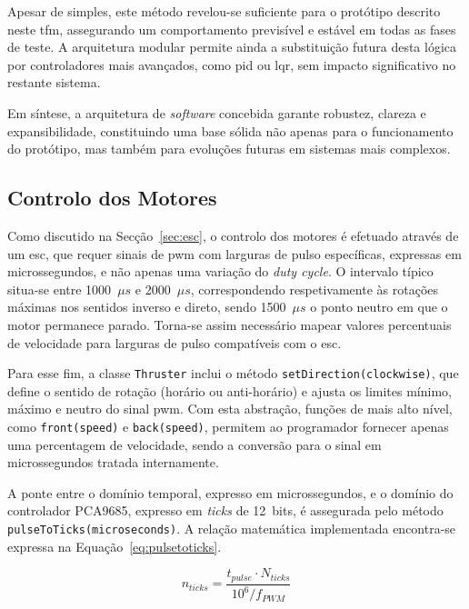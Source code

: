 Apesar de simples, este método revelou-se suficiente para o protótipo descrito neste \gls{tfm}, assegurando um comportamento previsível e estável em todas as fases de teste. A arquitetura modular permite ainda a substituição futura desta lógica por controladores mais avançados, como \acrfull{pid} ou \acrfull{lqr}, sem impacto significativo no restante sistema.  

Em síntese, a arquitetura de \emph{software} concebida garante robustez, clareza e expansibilidade, constituindo uma base sólida não apenas para o funcionamento do protótipo, mas também para evoluções futuras em sistemas mais complexos.


\subsection{Controlo dos Motores}
\label{subsec:controlo-de-motores}

Como discutido na Secção~\ref{sec:esc}, o controlo dos motores é efetuado através de um \gls{esc}, que requer sinais de \gls{pwm} com larguras de pulso específicas, expressas em microssegundos, e não apenas uma variação do \emph{duty cycle}. O intervalo típico situa-se entre 1000~\(\mu s\) e 2000~\(\mu s\), correspondendo respetivamente às rotações máximas nos sentidos inverso e direto, sendo 1500~\(\mu s\) o ponto neutro em que o motor permanece parado. Torna-se assim necessário mapear valores percentuais de velocidade para larguras de pulso compatíveis com o \gls{esc}.  

Para esse fim, a classe \texttt{Thruster} inclui o método \texttt{setDirection(clockwise)}, que define o sentido de rotação (horário ou anti-horário) e ajusta os limites mínimo, máximo e neutro do sinal \gls{pwm}. Com esta abstração, funções de mais alto nível, como \texttt{front(speed)} e \texttt{back(speed)}, permitem ao programador fornecer apenas uma percentagem de velocidade, sendo a conversão para o sinal em microssegundos tratada internamente.  

A ponte entre o domínio temporal, expresso em microssegundos, e o domínio do controlador PCA9685, expresso em \emph{ticks} de 12~bits, é assegurada pelo método \texttt{pulseToTicks(microseconds)}. A relação matemática implementada encontra-se expressa na Equação~\ref{eq:pulsetoticks}.  

\begin{equation}
n_{ticks} = \frac{t_{pulse} \cdot N_{ticks}}{10^6 / f_{PWM}}
\label{eq:pulsetoticks}
\end{equation}

